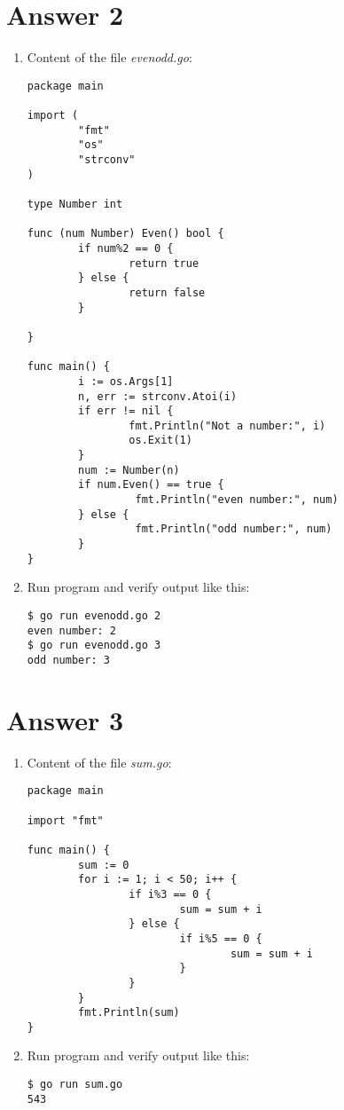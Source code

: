 \documentclass[11pt,a4paper]{article}
\begin{document}
\section*{Answer 2}
\begin{enumerate}
\item Content of the file {\it evenodd.go}:
\begin{verbatim}
package main

import (
        "fmt"
        "os"
        "strconv"
)

type Number int

func (num Number) Even() bool {
        if num%2 == 0 {
                return true
        } else {
                return false
        }

}

func main() {
        i := os.Args[1]
        n, err := strconv.Atoi(i)
        if err != nil {
                fmt.Println("Not a number:", i)
                os.Exit(1)
        }
        num := Number(n)
        if num.Even() == true {
                 fmt.Println("even number:", num)
        } else {
                 fmt.Println("odd number:", num)
        }
}
\end{verbatim}

\item Run program and verify output like this:
\begin{verbatim}
$ go run evenodd.go 2
even number: 2
$ go run evenodd.go 3
odd number: 3
\end{verbatim}

\end{enumerate}

\section*{Answer 3}
\begin{enumerate}
\item Content of the file {\it sum.go}:
\begin{verbatim}
package main

import "fmt"

func main() {
        sum := 0
        for i := 1; i < 50; i++ {
                if i%3 == 0 {
                        sum = sum + i
                } else {
                        if i%5 == 0 {
                                sum = sum + i
                        }
                }
        }
        fmt.Println(sum)
}
\end{verbatim}

\item Run program and verify output like this:
\begin{verbatim}
$ go run sum.go
543
\end{verbatim}

\end{enumerate}
\end{document}
